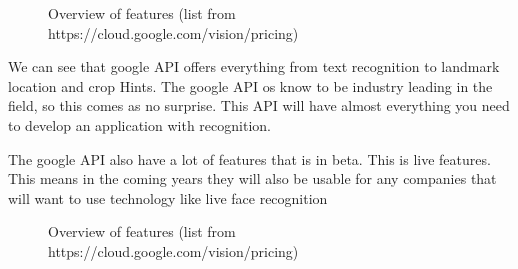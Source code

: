 \begin{figure}[h]
    \caption{Overview of features (list from https://cloud.google.com/vision/pricing)}
    \label{fig:Features}
\end{figure}

We can see that google API offers everything from text recognition to landmark location and crop Hints.
The google API os know to be industry leading in the field, so this comes as no surprise.
This API will have almost everything you need to develop an application with recognition.

The google API also have a lot of features that is in beta.
This is live features.
This means in the coming years they will also be usable for any companies that will want to use technology like live face recognition
\clearpage


\begin{figure}[h]
    \caption{Overview of features (list from https://cloud.google.com/vision/pricing)}
    \label{fig:Prices}
\end{figure}

